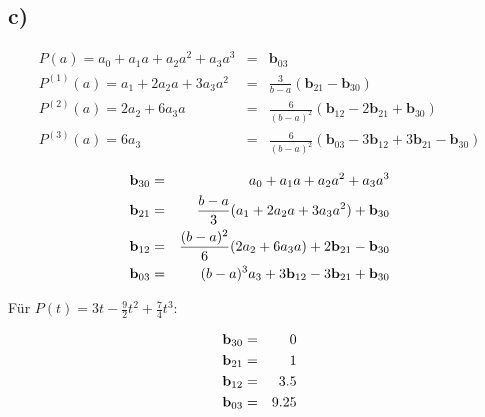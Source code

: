 \subsection*{c)}

\begin{eqnarray}
    P(a)= a_0 + a_1 a + a_2 a^2 + a_3 a^3 &=& \mathbf{b}_{03}\\
    P^{(1)}(a)= a_1 + 2 a_2 a  + 3 a_3 a^2 &=& \frac{3}{b-a}\left(\mathbf{b}_{21}-\mathbf{b}_{30}\right)\\
    P^{(2)}(a) = 2a_2 + 6a_3a &=&   \frac{6}{(b-a)^2}\left(\mathbf{b}_{12}-2\mathbf{b}_{21}+\mathbf{b}_{30}\right)\\
    P^{(3)}(a) = 6a_3 &=& \frac{6}{(b-a)^2}\left(\mathbf{b}_{03}-3\mathbf{b}_{12}+3\mathbf{b}_{21}-\mathbf{b}_{30}\right)
\end{eqnarray}


\begin{eqnarray}
    {\bf b}_{30}&=&a_0 + a_1 a + a_2 a^2 + a_3 a^3 \\
    {\bf b}_{21}&=&\frac{b-a}{3}(a_1 + 2 a_2 a  + 3 a_3 a^2 ) + \mathbf{b}_{30}\\ \nonumber
    {\bf b}_{12}&=&\frac{(b-a)^2}{6}(2a_2 + 6 a_3 a) + 2 \mathbf{b}_{21} - \mathbf{b}_{30}\\
    {\bf b}_{03}&=&(b-a)^3 a_3 + 3 \mathbf{b}_{12} - 3 \mathbf{b}_{21} + \mathbf{b}_{30}
\end{eqnarray}

F\"ur $P(t) = 3t - \frac{9}{2} t^2 + \frac{7}{4} t^3$:

\begin{eqnarray}
    {\bf b}_{30}&=& 0 \\
    {\bf b}_{21}&=& 1 \\
    {\bf b}_{12}&=&3.5\\
    {\bf b}_{03}&=& 9.25
\end{eqnarray}


